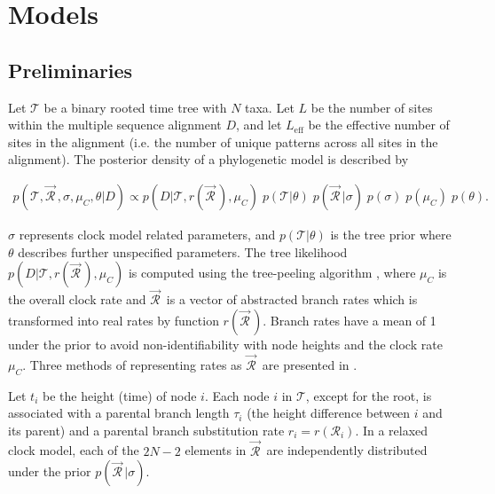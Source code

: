 \documentclass[10pt,letterpaper]{article}
\begin{document}





\section*{Models} \label{sect:models}



\subsection*{Preliminaries}



Let $\mathcal{T}$ be a binary rooted time tree with $N$ taxa. Let $L$ be the number of sites within the multiple sequence alignment $D$, and let $L_\text{eff}$ be the effective number of sites in the alignment (i.e. the number of unique patterns across all sites in the alignment). The posterior density of a phylogenetic model is described by

\begin{eqnarray}
\label{eq:bayesian}
p(\mathcal{T}, \vec{\mathcal{R}}^{\,}, \sigma, \mu_C, \theta|D) \propto  p(D|\mathcal{T}, r(\vec{\mathcal{R}}^{\,}), \mu_C) \; p(\mathcal{T}|\theta) \;  p(\vec{\mathcal{R}}^{\,} | \sigma) \; p(\sigma) \; p(\mu_C) \; p(\theta).
\end{eqnarray}


$\sigma$ represents clock model related parameters, and $p(\mathcal{T}|\theta)$ is the tree prior where $\theta$ describes further unspecified parameters. 
The tree likelihood $p(D|\mathcal{T}, r(\vec{\mathcal{R}}^{\,}), \mu_C)$ is computed using the tree-peeling algorithm \cite{felsenstein1981evolutionary}, where $\mu_C$ is the overall clock rate and
$\vec{\mathcal{R}}^{\,}$ is a vector of abstracted branch rates which is transformed into real rates by function $r(\vec{\mathcal{R}}^{\,})$. 
Branch rates have a mean of 1 under the prior to avoid non-identifiability with node heights and the clock rate $\mu_C$.
Three methods of representing rates as $\vec{\mathcal{R}}^{\,}$ are presented in \textbf{}.  





Let $t_i$ be the height (time) of node $i$.
Each node $i$ in $\mathcal{T}$, except for the root, is associated with a parental branch length $\tau_i$ (the height difference between $i$ and its parent)  and a parental branch substitution rate $r_i = r(\mathcal{R}_i)$. 
In a relaxed clock model, each of the $2N-2$ elements in $\vec{\mathcal{R}}^{\,}$ are independently distributed under the prior $p(\vec{\mathcal{R}}^{\,} | \sigma)$.
\end{document}
